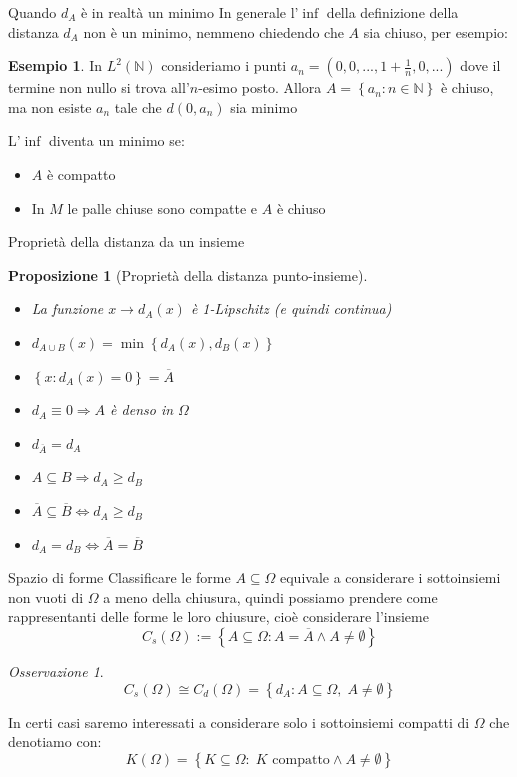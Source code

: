 \documentclass{beamer}
\newcounter{counter1}
\theoremstyle{plain}
\newtheorem{mypro}[counter1]{Proposizione}
\theoremstyle{definition}
\newtheorem{myes}[counter1]{Esempio}
\theoremstyle{remark}
\newtheorem{myoss}[counter1]{Osservazione}
\newcommand{\obar}[1]{\overline{#1}}
\newcommand{\set}[1]{\left\{#1\right\}}
\begin{document}
\begin{frame}{Quando $d_A$ \`e in realt\`a un minimo}
  In generale l'$\inf$ della definizione della distanza $d_A$ non \`e
  un minimo, nemmeno chiedendo che $A$ sia chiuso, per esempio:
  \begin{myes}
    In $L^2(\mathbb{N})$ consideriamo i punti $a_n = ( 0, 0, ..., 1 +
    \frac{1}{n} , 0, ...)$ dove il termine non nullo si trova
    all'$n$-esimo posto. Allora $A = \set{ a_n : n\in \mathbb{N}}$ \`e
    chiuso, ma non esiste $a_n$ tale che $d(0,a_n)$ sia minimo
  \end{myes}

  L'$\inf$ diventa un minimo se:
  \begin{itemize}
  \item $A$ \`e compatto
  \item In $M$ le palle chiuse sono compatte e $A$ è chiuso
  \end{itemize}
\end{frame}

\begin{frame}{Proprietà della distanza da un insieme}
  \begin{mypro}[Proprietà della distanza punto-insieme]
    \begin{itemize}
    \item La funzione $x \rightarrow d_A(x)$ è 1-Lipschitz (e quindi
      continua)
    \item $d_{A\cup B}(x) = \min\set{d_A(x),d_B(x)}$
    \item $\set{x:d_A(x) = 0} = \obar A$
    \item $d_A \equiv 0 \Rightarrow A$ è denso in $\Omega$
    \item $d_{\obar A} = d_A$
    \item $A\subseteq B \Rightarrow d_A \ge d_B$
    \item $\obar{ A} \subseteq \obar B \Leftrightarrow d_A \ge d_B$
    \item $d_A = d_B \Leftrightarrow \obar A = \obar B$
    \end{itemize}
  \end{mypro}
\end{frame}

\begin{frame}{Spazio di forme}
  Classificare le forme $A \subseteq \Omega$ equivale a considerare i
  sottoinsiemi non vuoti di $\Omega$ a meno della chiusura, quindi
  possiamo prendere come rappresentanti delle forme le loro chiusure,
  cioè considerare l'insieme
  \[ C_s(\Omega) := \set{ A \subseteq \Omega : A = \obar A \wedge A
    \neq \emptyset } \]

  \begin{myoss}
    \[ C_s(\Omega) \cong C_d(\Omega) = \set{d_A : A \subseteq \Omega,\;
      A \neq \emptyset} \]
  \end{myoss}
  \vfill
  In certi casi saremo interessati a considerare solo i sottoinsiemi
  compatti di $\Omega$ che denotiamo con:
  \[ K(\Omega) = \set{K\subseteq \Omega :\; K \text{ compatto} \wedge
    A \neq \emptyset} \]
\end{frame}
\end{document}

